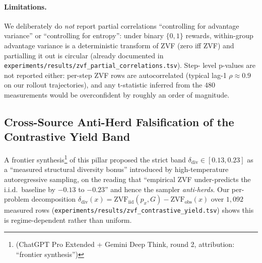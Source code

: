 \documentclass{article}
\newcommand{\note}[1]{\footnote{#1}}
\begin{document}
\paragraph{Limitations.}
We deliberately do \emph{not} report partial correlations
``controlling for advantage variance'' or ``controlling for
entropy'': under binary $\{0,1\}$ rewards, within-group advantage
variance is a deterministic transform of ZVF (zero iff ZVF) and
partialling it out is circular (already documented in
\texttt{experiments/results/zvf\_partial\_correlations.tsv}). Step-
level p-values are not reported either: per-step ZVF rows are
autocorrelated (typical lag-1 $\rho \approx 0.9$ on our rollout
trajectories), and any t-statistic inferred from the $480$
measurements would be overconfident by roughly an order of
magnitude.

\subsection{Cross-Source Anti-Herd Falsification of the Contrastive Yield Band}
\label{sec:zvf-cross-source-falsification}

A frontier synthesis\note{(ChatGPT Pro Extended + Gemini Deep Think,
round 2, attribution: ``frontier synthesis'')} of this pillar proposed
the strict band $\delta_{\mathrm{div}} \in [0.13, 0.23]$ as a
``measured structural diversity bonus'' introduced by high-temperature
autoregressive sampling, on the reading that ``empirical ZVF
under-predicts the i.i.d.\ baseline by $-0.13$ to $-0.23$'' and hence
the sampler \emph{anti-herds}. Our per-problem decomposition
$\delta_{\mathrm{div}}(x) = \mathrm{ZVF}_{\mathrm{iid}}(p_x, G) -
\mathrm{ZVF}_{\mathrm{obs}}(x)$ over $1{,}092$ measured rows
(\texttt{experiments/results/zvf\_contrastive\_yield.tsv}) shows this
is regime-dependent rather than uniform.
\end{document}
